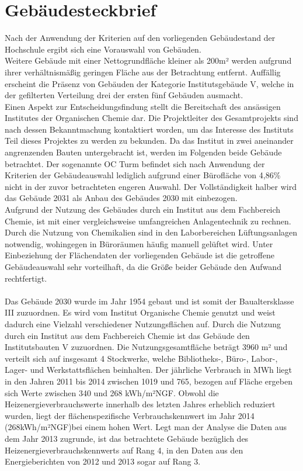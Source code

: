 \section{Gebäudesteckbrief}
\label{sec:Gebäudesteckbrief} 
Nach der Anwendung der Kriterien auf den vorliegenden Gebäudestand der Hochschule ergibt sich eine Vorauswahl von Gebäuden. \\
Weitere Gebäude mit einer Nettogrundfläche kleiner als 200m² werden aufgrund ihrer verhältnismäßig geringen Fläche aus der Betrachtung entfernt. Auffällig erscheint die Präsenz von Gebäuden der Kategorie Institutsgebäude V, welche in der gefilterten Verteilung drei der ersten fünf Gebäuden ausmacht. \\
Einen Aspekt zur Entscheidungsfindung stellt die Bereitschaft des ansässigen Institutes der Organischen Chemie dar. Die Projektleiter des Gesamtprojekts sind nach dessen Bekanntmachung kontaktiert worden, um das Interesse des Instituts Teil dieses Projektes zu werden zu bekunden. Da das Institut in zwei aneinander angrenzenden Bauten untergebracht ist, werden im Folgenden beide Gebäude betrachtet. Der sogenannte OC Turm befindet sich nach Anwendung der Kriterien der Gebäudeauswahl lediglich aufgrund einer Bürofläche von 4,86\% nicht in der zuvor betrachteten engeren Auswahl. Der Vollständigkeit halber wird das Gebäude 2031 als Anbau des Gebäudes 2030 mit einbezogen. 
\\
Aufgrund der Nutzung des Gebäudes durch ein Institut aus dem Fachbereich Chemie, ist mit einer vergleichsweise umfangreichen Anlagentechnik zu rechnen. Durch die Nutzung von Chemikalien sind in den Laborbereichen Lüftungsanlagen notwendig, wohingegen in  Büroräumen häufig manuell gelüftet wird. 
Unter Einbeziehung der Flächendaten der vorliegenden Gebäude ist die getroffene Gebäudeauswahl sehr vorteilhaft, da die Größe beider Gebäude den Aufwand rechtfertigt. \\
\\
Das Gebäude 2030 wurde im Jahr 1954 gebaut und ist somit der Baualtersklasse III zuzuordnen. Es wird vom Institut Organische Chemie genutzt und weist dadurch eine Vielzahl verschiedener Nutzungsflächen auf. Durch die Nutzung durch ein Institut aus dem Fachbereich Chemie ist das Gebäude den Institutsbauten V zuzuordnen. Die Nutzungsgesamtfläche beträgt 3960 m² und verteilt sich auf insgesamt 4 Stockwerke, welche Bibliotheks-, Büro-, Labor-, Lager- und Werkstattsflächen beinhalten. Der jährliche Verbrauch in MWh liegt in den Jahren 2011 bis 2014 zwischen 1019 und 765, bezogen auf Fläche ergeben sich Werte zwischen 340 und 268 kWh/m²NGF. Obwohl die Heizenergieverbrauchswerte innerhalb des letzten Jahres erheblich reduziert wurden, liegt der flächenspezifische Verbrauchskennwert im Jahr 2014 (268kWh/m²NGF)bei einem hohen Wert. Legt man der Analyse die Daten aus dem Jahr 2013 zugrunde, ist das betrachtete Gebäude bezüglich des Heizenergieverbrauchskennwerts auf Rang 4, in den Daten aus den Energieberichten von 2012 und 2013 sogar auf Rang 3. \\
